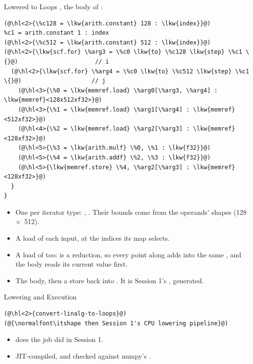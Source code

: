 \documentclass[aspectratio=169,10pt]{beamer}
\begin{document}
\begin{frame}[fragile]{Lowered to Loops}
  , the body of
  :
\begin{lstlisting}[language=mlir]
%c0 = arith.constant 0 : index
(@\hl<2>{\%c128 = \lkw{arith.constant} 128 : \lkw{index}}@)
%c1 = arith.constant 1 : index
(@\hl<2>{\%c512 = \lkw{arith.constant} 512 : \lkw{index}}@)
(@\hl<2>{\lkw{scf.for} \%arg3 = \%c0 \lkw{to} \%c128 \lkw{step} \%c1 \{}@)                      // i
  (@\hl<2>{\lkw{scf.for} \%arg4 = \%c0 \lkw{to} \%c512 \lkw{step} \%c1 \{}@)                    // j
    (@\hl<3>{\%0 = \lkw{memref.load} \%arg0[\%arg3, \%arg4] : \lkw{memref}<128x512xf32>}@)
    (@\hl<3>{\%1 = \lkw{memref.load} \%arg1[\%arg4] : \lkw{memref}<512xf32>}@)
    (@\hl<4>{\%2 = \lkw{memref.load} \%arg2[\%arg3] : \lkw{memref}<128xf32>}@)
    (@\hl<5>{\%3 = \lkw{arith.mulf} \%0, \%1 : \lkw{f32}}@)
    (@\hl<5>{\%4 = \lkw{arith.addf} \%2, \%3 : \lkw{f32}}@)
    (@\hl<5>{\lkw{memref.store} \%4, \%arg2[\%arg3] : \lkw{memref}<128xf32>}@)
  }
}
\end{lstlisting}
  \vspace{0.2em}
  \begin{itemize}
    \item<2-> One  per iterator type: , . Their
      bounds come from the operands' shapes (128~$\times$~512).
    \item<3-> A load of each input, at the indices its map selects.
    \item<4-> A load of  too:  is a \alert{reduction}, so every
      point along  adds into the same , and the body reads
      its current value first.
    \item<5-> The body, then a store back into . It is Session 1's
      , generated.
  \end{itemize}
\end{frame}

\begin{frame}[fragile]{Lowering and Execution}
\begin{lstlisting}[style=plain,basicstyle=\ttfamily\small]
(@\hl<2>{convert-linalg-to-loops}@)
(@{\normalfont\itshape then Session 1's CPU lowering pipeline}@)
\end{lstlisting}
  \vspace{0.3em}
  \begin{itemize}
    \item<2->  does the job
       did in Session 1.
    \item<3-> JIT-compiled, and checked against numpy's .
  \end{itemize}
  \vspace{0.2em}
\end{frame}
\end{document}
